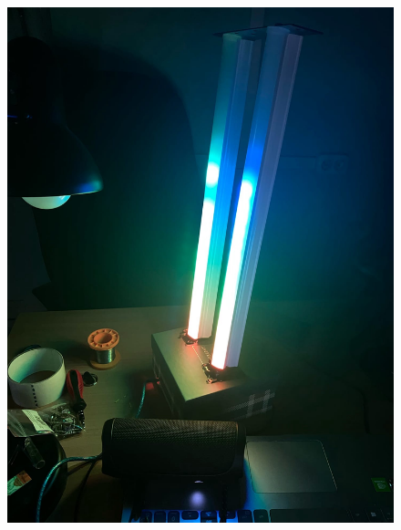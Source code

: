 \documentclass[a4paper, 12pt]{article}%
\begin{document}
\newpage

\begin{figure}[!h]
\begin{center}
\includegraphics[scale=0.25]{pictures/bea1.jpg}
\end{center}
\end{figure}

\newpage
\end{document}
